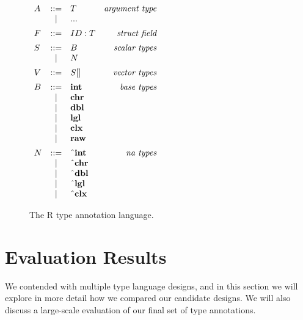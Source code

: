 \documentclass[acmsmall,review,anonymous]{acmart}\settopmatter{printfolios=true,printccs=false,printacmref=false}
\begin{document}
\begin{figure}
    \hfill
    \begin{minipage}{.45\linewidth}
    \begin{flushright}
    $ \begin{array}{lclr}
    A & ::= & T & \text{\it argument type} \\
      & |   & {\bf ...} \vspace{5pt} \\
    F & ::= & ID : T & \text{\it struct field}\vspace{5pt}\\
    S & ::= & B & \text{\it scalar types} \\
      & |   & N \vspace{5pt}\\
    V & ::= & S \lbrack \rbrack & \text{\it vector types} \vspace{5pt}\\
    B & ::= & {\bf int} & \text{\it base types} \\
      & |   & {\bf chr} \\
      & |   & {\bf dbl} \\
      & |   & {\bf lgl} \\
      & |   & {\bf clx} \\
      & |   & {\bf raw} \vspace{5pt}\\
    N & ::= & {\bf \string^int} & \text{\it na types} \\
      & |   & {\bf \string^chr} \\
      & |   & {\bf \string^dbl} \\
      & |   & {\bf \string^lgl} \\
      & |   & {\bf \string^clx} \\
\end{array} $
    \end{flushright}
    \end{minipage}
    \caption{The R type annotation language.}
    \label{fig:types}
\end{figure}

%
%
%
%
%
%
\section{Evaluation Results}
\label{sec:evaluation}

We contended with multiple type language designs, and in this section we will explore in more detail how we compared our candidate designs.
We will also discuss a large-scale evaluation of our final set of type annotations.
\end{document}
